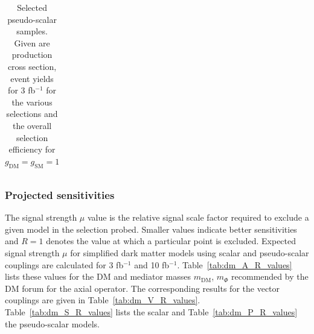 \begin{table}[h!]
\begin{tabular}{lllllll}
\hline
\end{tabular}
\caption{Selected pseudo-scalar samples. Given are production cross section, event yields for 3 fb$^{-1 }$ for the various selections and the overall selection efficiency for $g_\textrm{DM}=g_\textrm{SM}=1$}
\label{tab:dm_P_g1_3fb}
\end{table}



\subsubsection{Projected sensitivities}

The signal strength $\mu$ value is the relative signal scale factor required to exclude a given model in the selection probed. Smaller values indicate better sensitivities and $R=1$ denotes the value at which a particular point is excluded. Expected signal strength $\mu$ for simplified dark matter models using scalar and pseudo-scalar couplings are calculated for 3 fb$^{-1 }$ and 10 fb$^{-1 }$. Table~\ref{tab:dm_A_R_values} lists these
values for the DM and mediator masses $m_\textrm{DM}$, $m_\Phi$ recommended by the DM forum for the axial operator. The corresponding results for the vector couplings are given in Table~\ref{tab:dm_V_R_values}. Table~\ref{tab:dm_S_R_values} lists the scalar and Table~\ref{tab:dm_P_R_values} the pseudo-scalar models.



